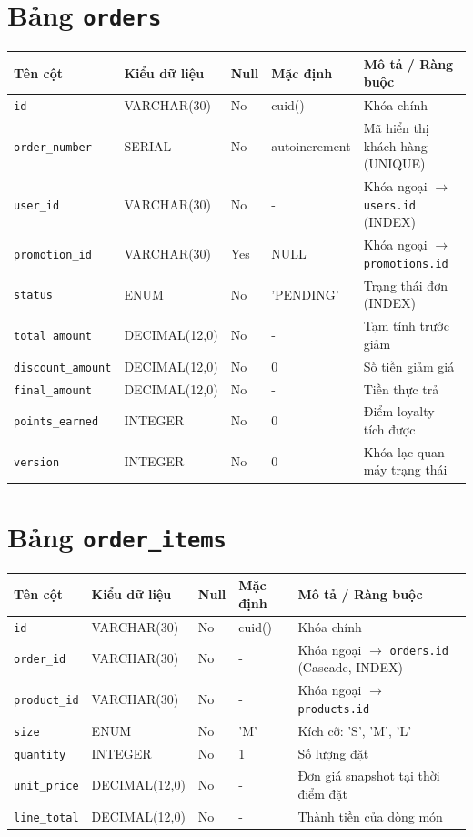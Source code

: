 \section{Bảng \texttt{orders}}
\begin{table}[htbp]
\centering
\small
\begin{tabularx}{\textwidth}{llllX}
\toprule
\textbf{Tên cột} & \textbf{Kiểu dữ liệu} & \textbf{Null} & \textbf{Mặc định} & \textbf{Mô tả / Ràng buộc} \\
\midrule
\texttt{id} & VARCHAR(30) & No & cuid() & Khóa chính \\
\texttt{order\_number} & SERIAL & No & autoincrement & Mã hiển thị khách hàng (UNIQUE) \\
\texttt{user\_id} & VARCHAR(30) & No & - & Khóa ngoại \(\to\) \texttt{users.id} (INDEX) \\
\texttt{promotion\_id} & VARCHAR(30) & Yes & NULL & Khóa ngoại \(\to\) \texttt{promotions.id} \\
\texttt{status} & ENUM & No & 'PENDING' & Trạng thái đơn (INDEX) \\
\texttt{total\_amount} & DECIMAL(12,0) & No & - & Tạm tính trước giảm \\
\texttt{discount\_amount} & DECIMAL(12,0) & No & 0 & Số tiền giảm giá \\
\texttt{final\_amount} & DECIMAL(12,0) & No & - & Tiền thực trả \\
\texttt{points\_earned} & INTEGER & No & 0 & Điểm loyalty tích được \\
\texttt{version} & INTEGER & No & 0 & Khóa lạc quan máy trạng thái \\
\bottomrule
\end{tabularx}
\end{table}

\section{Bảng \texttt{order\_items}}
\begin{table}[htbp]
\centering
\small
\begin{tabularx}{\textwidth}{llllX}
\toprule
\textbf{Tên cột} & \textbf{Kiểu dữ liệu} & \textbf{Null} & \textbf{Mặc định} & \textbf{Mô tả / Ràng buộc} \\
\midrule
\texttt{id} & VARCHAR(30) & No & cuid() & Khóa chính \\
\texttt{order\_id} & VARCHAR(30) & No & - & Khóa ngoại \(\to\) \texttt{orders.id} (Cascade, INDEX) \\
\texttt{product\_id} & VARCHAR(30) & No & - & Khóa ngoại \(\to\) \texttt{products.id} \\
\texttt{size} & ENUM & No & 'M' & Kích cỡ: 'S', 'M', 'L' \\
\texttt{quantity} & INTEGER & No & 1 & Số lượng đặt \\
\texttt{unit\_price} & DECIMAL(12,0) & No & - & Đơn giá snapshot tại thời điểm đặt \\
\texttt{line\_total} & DECIMAL(12,0) & No & - & Thành tiền của dòng món \\
\bottomrule
\end{tabularx}
\end{table}

